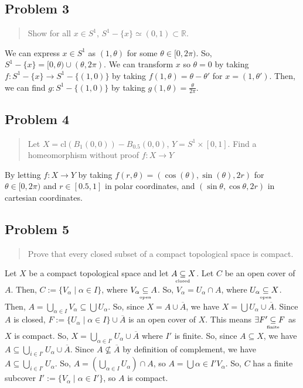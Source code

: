 \documentclass[8pt]{extarticle}
\newcommand{\plain}[1]{\textrm{#1}}
\newcommand{\open}{\underset{\clap{\tiny open}}{\subseteq}}
\newcommand{\closed}{\underset{\clap{\tiny closed}}{\subseteq}}
\newcommand{\finite}{\underset{\clap{\tiny finite}}{\subseteq}}
\begin{document}
{\subsection*{Problem 3}%
\begin{quote}
	Show for all $x\in S^1$, $S^{1}-\{x\} \simeq (0,1) \subset \mathbb{R}$.
\end{quote}
We can express $x\in S^1$ as $(1,\theta)$ for some $\theta\in [0,2\pi)$. So, $S^1-\{x\} = [0,\theta)\cup(\theta,2\pi)$. We can transform $x$ so $\theta = 0$ by taking $f:S^1-\{x\} \rightarrow S^1-\{(1,0)\}$ by taking $f(1,\theta) = \theta - \theta'$ for $x = (1,\theta')$. Then, we can find $g:S^1-\{(1,0)\}$ by taking $g(1,\theta) = \frac{\theta}{2\pi} $.
\subsection*{Problem 4}%
\begin{quote}
	Let $X = \plain{cl}(B_{1}(0,0)) - B_{0.5}(0,0)$, $Y = S^1 \times [0,1]$. Find a homeomorphism without proof $f:X\rightarrow Y$
\end{quote}
By letting $f:X\rightarrow Y$ by taking $f(r,\theta) = (\cos(\theta),\sin(\theta),2r)$ for $\theta \in [0,2\pi)$ and $r\in [0.5,1]$ in polar coordinates, and $(\sin\theta, \cos\theta, 2r)$ in cartesian coordinates.
\subsection*{Problem 5}%

\begin{quote}
	Prove that every closed subset of a compact topological space is compact.
\end{quote}
Let $X$ be a compact topological space and let $A\closed X$. Let $C$ be an open cover of $A$. Then, $C:= \{V_{\alpha}\mid \alpha\in I\}$, where $V_{\alpha}\open A$. So, $V_{\alpha} = U_{\alpha}\cap A$, where $U_{\alpha}\open X$. Then, $A = \bigcup_{\alpha\in I}V_{\alpha}\subseteq \bigcup U_{\alpha}$. So, since $X = A\cup \overline{A}$, we have $X = \bigcup U_{\alpha}\cup \overline{A}$. Since $A$ is closed, $F:=\{U_{\alpha}\mid \alpha\in I\}\cup \overline{A}$ is an open cover of $X$. This means $\exists F'\finite F$ as $X$ is compact. So, $X = \bigcup_{\alpha\in I'}U_{\alpha} \cup \overline{A}$ where $I'$ is finite. So, since $A\subseteq X$, we have $A\subseteq \bigcup_{i\in I'}U_{\alpha} \cup \overline{A}$. Since $A\not\subseteq \overline{A}$ by definition of complement, we have $A\subseteq \bigcup_{i\in I'}U_{\alpha}$. So, $A = \left(\bigcup_{\alpha\in I}U_{\alpha}\right)\cap A$, so $A = \bigcup{\alpha\in I'}V_{\alpha}$. So, $C$ has a finite subcover $I':=\{V_{\alpha}\mid \alpha\in I'\}$, so $A$ is compact.
\pagebreak
}
\end{document}
